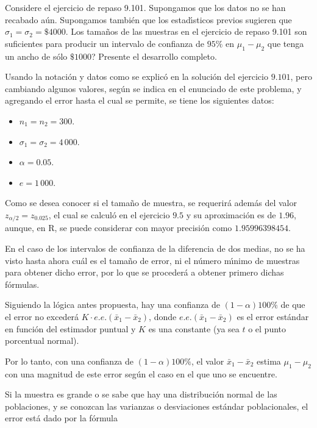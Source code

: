 \begin{enunciado}
 Considere el ejercicio de repaso 9.101. Supongamos que los datos no se han recabado a\'un. Supongamos tambi\'en que los estad\'{\i}sticos previos sugieren que $\sigma_1 = \sigma_2 = \$4000$. Los tama\~nos de las muestras en el ejercicio de repaso 9.101 son suficientes para producir un intervalo de confianza de $95\%$ en $\mu_1 - \mu_2$ que tenga un ancho de s\'olo $\$1000$? Presente el desarrollo completo.
\end{enunciado}

\begin{solucion}
 Usando la notaci\'on y datos como se explic\'o en la soluci\'on del ejercicio $9.101$, pero cambiando algunos valores, seg\'un se indica en el enunciado de este problema, y agregando el error hasta el cual se permite, se tiene los siguientes datos:
 \begin{itemize}
  \item $n_1 = n_2 = 300$.
  \item $\sigma_1 = \sigma_2 = 4\,000$.
  \item $\alpha = 0.05$.
  \item $e = 1\,000$.
 \end{itemize}
 Como se desea conocer si el tama\~no de muestra, se requerir\'a adem\'as del valor $z_{\alpha/2} = z_{0.025}$, el cual se calcul\'o en el ejercicio $9.5$ y su aproximaci\'on es de $1.96$, aunque, en R, se puede considerar con mayor precisi\'on como $1.95996398454$.
 \par 
 En el caso de los intervalos  de confianza de la diferencia de dos medias, no se ha visto hasta ahora cu\'al es el tama\~no de error, ni el n\'umero m\'{\i}nimo de muestras para obtener dicho error, por lo que se proceder\'a a obtener primero dichas f\'ormulas.
 \par 
 Siguiendo la l\'ogica antes propuesta, hay una confianza de $(1-\alpha)100\%$ de que el error no exceder\'a $K\cdot e.e.\left( \bar{x}_1 - \bar{x}_2 \right)$, donde $e.e.\left( \bar{x}_1 - \bar{x}_2 \right)$ es el error est\'andar en funci\'on del estimador puntual y $K$ es una constante (ya sea $t$ o el punto porcentual normal).
 \par 
 Por lo tanto, con una confianza de $(1-\alpha)100\%$, el valor $\bar{x}_1 - \bar{x}_2$ estima $\mu_1 - \mu_2$ con una magnitud de este error seg\'un el caso en el que uno se encuentre.
 \par 
 Si la muestra es grande o se sabe que hay una distribuci\'on normal de las poblaciones, y se conozcan las varianzas o desviaciones est\'andar poblacionales, el error est\'a dado por la f\'ormula

\end{solucion}
